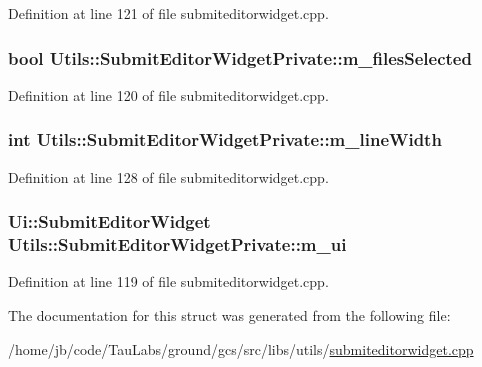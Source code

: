 \-Definition at line 121 of file submiteditorwidget.\-cpp.

\hypertarget{struct_utils_1_1_submit_editor_widget_private_ae84602f3befda38e44858e5cc60f79be}{
\subsubsection[{m\-\_\-files\-Selected}]{\setlength{\rightskip}{0pt plus 5cm}bool {\bf \-Utils\-::\-Submit\-Editor\-Widget\-Private\-::m\-\_\-files\-Selected}}}\label{struct_utils_1_1_submit_editor_widget_private_ae84602f3befda38e44858e5cc60f79be}


\-Definition at line 120 of file submiteditorwidget.\-cpp.

\hypertarget{struct_utils_1_1_submit_editor_widget_private_a26a9f360cbc9440cbbdcb9f5b9897807}{
\subsubsection[{m\-\_\-line\-Width}]{\setlength{\rightskip}{0pt plus 5cm}int {\bf \-Utils\-::\-Submit\-Editor\-Widget\-Private\-::m\-\_\-line\-Width}}}\label{struct_utils_1_1_submit_editor_widget_private_a26a9f360cbc9440cbbdcb9f5b9897807}


\-Definition at line 128 of file submiteditorwidget.\-cpp.

\hypertarget{struct_utils_1_1_submit_editor_widget_private_a5476c01db3bc97951db656048ab0c0c8}{
\subsubsection[{m\-\_\-ui}]{\setlength{\rightskip}{0pt plus 5cm}\-Ui\-::\-Submit\-Editor\-Widget {\bf \-Utils\-::\-Submit\-Editor\-Widget\-Private\-::m\-\_\-ui}}}\label{struct_utils_1_1_submit_editor_widget_private_a5476c01db3bc97951db656048ab0c0c8}


\-Definition at line 119 of file submiteditorwidget.\-cpp.



\-The documentation for this struct was generated from the following file\-:\begin{DoxyCompactItemize}
\item 
/home/jb/code/\-Tau\-Labs/ground/gcs/src/libs/utils/\hyperlink{submiteditorwidget_8cpp}{submiteditorwidget.\-cpp}\end{DoxyCompactItemize}
